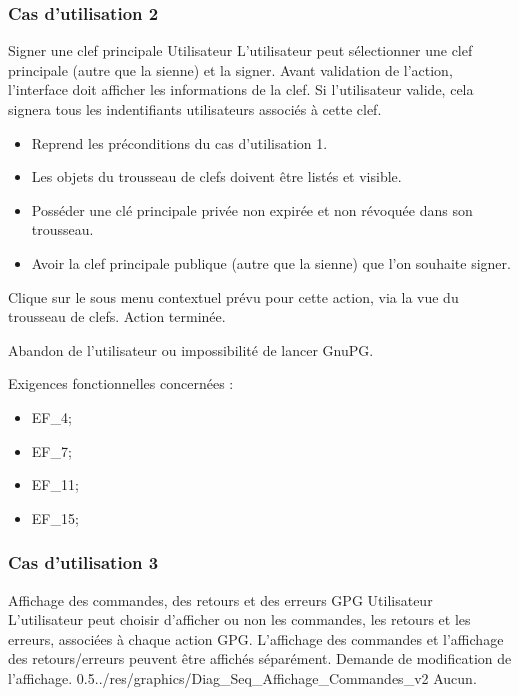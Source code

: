 \documentclass{../res/univ-projet}
\begin{document}
\subsubsection{Cas d'utilisation 2}
\fiche
{Signer une clef principale}
{Utilisateur}
{L'utilisateur peut sélectionner une clef principale (autre que la sienne) et la signer. Avant validation de l'action, l'interface doit afficher
les informations de la clef. Si l'utilisateur valide, cela signera tous les indentifiants utilisateurs associés à cette clef.
}
{
  \begin{itemize}
    \item Reprend les préconditions du cas d'utilisation 1.
    \item Les objets du trousseau de clefs doivent être listés et visible.
    \item Posséder une clé principale privée non expirée et non révoquée dans son trousseau.
    \item Avoir la clef principale publique (autre que la sienne) que l'on souhaite signer.
  \end{itemize}
}
{Clique sur le sous menu contextuel prévu pour cette action, via la vue du trousseau de clefs.}
{Action terminée.}
{

}
{

}
{Abandon de l'utilisateur ou impossibilité de lancer GnuPG.}
\vspace{0.5cm}

Exigences fonctionnelles concernées :
\begin{itemize}
 \item EF\_4;
 \item EF\_7;
 \item EF\_11;
 \item EF\_15;
\end{itemize}

\subsubsection{Cas d'utilisation 3}
\ficheGraphic
{Affichage des commandes, des retours et des erreurs GPG}
{Utilisateur}
{L'utilisateur peut choisir d'afficher ou non les commandes, les retours et les erreurs, associées à chaque action GPG. L'affichage des commandes et l'affichage des retours/erreurs peuvent être affichés séparément.}
{}
{Demande de modification de l'affichage.}
{}
{0.5}{../res/graphics/Diag_Seq_Affichage_Commandes_v2}
{Aucun.}   
\vspace{0.5cm}
\end{document}
